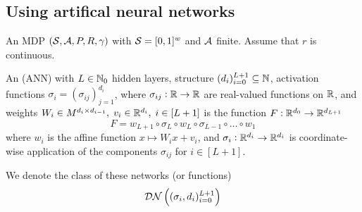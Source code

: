 \subsection{Using artifical neural networks}

\begin{sett}
  An MDP $(\mathcal{S}, \mathcal{A}, P, R, \gamma)$ with
  $\mathcal{S} = [0,1]^w$ and $\mathcal{A}$ finite.
  Assume that $r$ is continuous.
  \label{sett:annApprox}
\end{sett}

\begin{defn}\label{def_ANN}
  An  (ANN) with $L \in \mathbb{N}_0$
  hidden layers, structure
  $(d_i)_{i=0}^{L+1} \subseteq \mathbb{N}$,
  activation functions $\sigma_i = (\sigma_{ij})_{j=1}^{d_i}$, where
  $\sigma_{ij} : \mathbb{R} \to \mathbb{R}$ are real-valued functions on $\mathbb{R}$,
  and weights $W_i \in M^{d_i \times d_{i-1}}, \; v_i \in \mathbb{R}^{d_i}, \;
  i \in [L+1]$
  is the function $F:\mathbb{R}^{d_0} \to \mathbb{R}^{d_{L+1}}$ 
  \[ F = w_{L+1} \circ \sigma_L \circ w_L
  \circ \sigma_{L-1} \circ \dots \circ w_1 \]
  where $w_i$ is the affine function $x \mapsto W_i x + v_i$,
  and $\sigma_i : \mathbb{R}^{d_i} \to \mathbb{R}^{d_i}$ is coordinate-wise
  application of the components $\sigma_{ij}$ for $i \in [L+1]$.

  We denote the class of these networks (or functions)
  \[ \mathcal{DN} \left( (\sigma_i, d_i )_{i=0}^{L+1} \right) \]
\end{defn}


